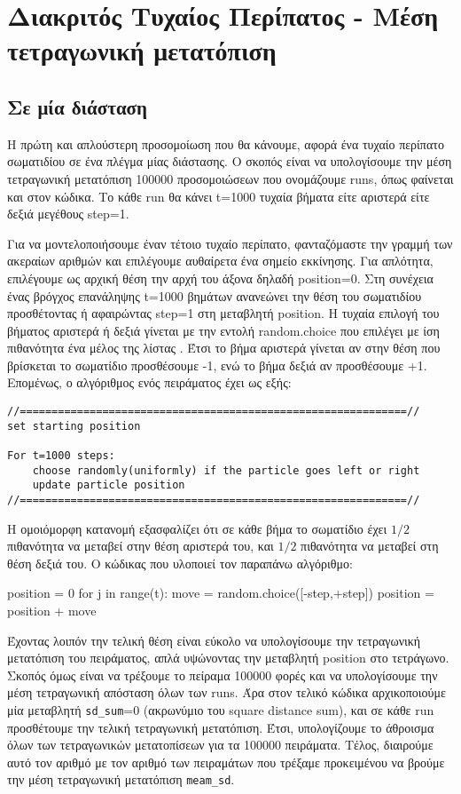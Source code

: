 \section{Διακριτός Τυχαίος Περίπατος - Μέση τετραγωνική μετατόπιση}
\subsection{Σε μία διάσταση}
\label{Part1_a}
Η πρώτη και απλούστερη προσομοίωση που θα κάνουμε, αφορά ένα τυχαίο περίπατο σωματιδίου σε ένα πλέγμα μίας διάστασης. Ο σκοπός είναι να υπολογίσουμε την μέση τετραγωνική μετατόπιση 100000 προσομοιώσεων που ονομάζουμε {\en runs}, όπως φαίνεται και στον κώδικα. Το κάθε {\en run} θα κάνει {\en t}=1000 τυχαία βήματα είτε αριστερά είτε δεξιά μεγέθους {\en step}=1.

Για να μοντελοποιήσουμε έναν τέτοιο τυχαίο περίπατο, φανταζόμαστε την γραμμή των ακεραίων αριθμών και επιλέγουμε αυθαίρετα ένα σημείο εκκίνησης. Για απλότητα, επιλέγουμε ως αρχική θέση την αρχή του άξονα δηλαδή {\en position}=0. Στη συνέχεια ένας βρόγχος επανάληψης {\en t}=1000 βημάτων ανανεώνει την θέση του σωματιδίου προσθέτοντας ή αφαιρώντας {\en step}=1 στη μεταβλητή {\en position}. Η τυχαία επιλογή του βήματος αριστερά ή δεξιά γίνεται με την εντολή {\en random.choice} που επιλέγει με ίση πιθανότητα ένα μέλος της λίστας {}. Έτσι το βήμα αριστερά γίνεται αν στην θέση που βρίσκεται το σωματίδιο προσθέσουμε -1, ενώ το βήμα δεξιά αν προσθέσουμε +1. Επομένως, ο αλγόριθμος ενός πειράματος έχει ως εξής:
\en

\pagebreak

\begin{lstlisting}
//=============================================================//
set starting position 

For t=1000 steps:
    choose randomly(uniformly) if the particle goes left or right
    update particle position
//=============================================================//
\end{lstlisting}
\gr
H ομοιόμορφη κατανομή εξασφαλίζει ότι σε κάθε βήμα το σωματίδιο έχει $1/2$ πιθανότητα να μεταβεί στην θέση αριστερά του, και $1/2$ πιθανότητα να μεταβεί στη θέση δεξιά του. O κώδικας που υλοποιεί τον παραπάνω αλγόριθμο:
\en
\begin{python}
position = 0
for j in range(t):
    move = random.choice([-step,+step])
    position = position + move
\end{python}

\gr
Έχοντας λοιπόν την τελική θέση είναι εύκολο να υπολογίσουμε την τετραγωνική μετατόπιση του πειράματος, απλά υψώνοντας την μεταβλητή {\en position} στο τετράγωνο. Σκοπός όμως είναι να τρέξουμε το πείραμα 100000 φορές και να υπολογίσουμε την μέση τετραγωνική απόσταση όλων των {\en runs}. Άρα στον τελικό κώδικα αρχικοποιούμε μία μεταβλητή {\en \texttt{sd\_sum}}=0 (ακρωνύμιο του {\en square distance sum}), και σε κάθε {\en run} προσθέτουμε την τελική τετραγωνική μετατόπιση. Έτσι, υπολογίζουμε το άθροισμα όλων των τετραγωνικών μετατοπίσεων για τα 100000 πειράματα. Τέλος, διαιρούμε αυτό τον αριθμό με τον αριθμό των πειραμάτων που τρέξαμε προκειμένου να βρούμε την μέση τετραγωνική μετατόπιση {\en \texttt{meam\_sd}}.


